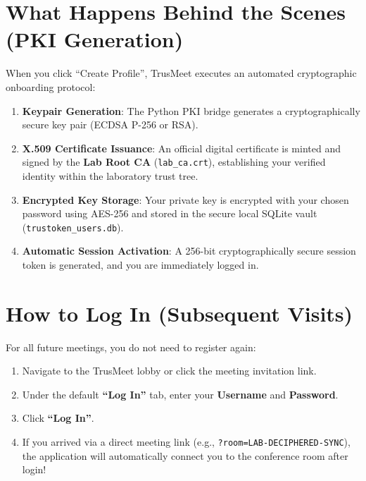 \documentclass[11pt,a4paper]{report}
\begin{document}
\section{What Happens Behind the Scenes (PKI Generation)}
When you click ``Create Profile'', TrusMeet executes an automated cryptographic onboarding protocol:
\begin{enumerate}[noitemsep]
    \item \textbf{Keypair Generation}: The Python PKI bridge generates a cryptographically secure key pair (ECDSA P-256 or RSA).
    \item \textbf{X.509 Certificate Issuance}: An official digital certificate is minted and signed by the \textbf{Lab Root CA} (\texttt{lab\_ca.crt}), establishing your verified identity within the laboratory trust tree.
    \item \textbf{Encrypted Key Storage}: Your private key is encrypted with your chosen password using AES-256 and stored in the secure local SQLite vault (\texttt{trustoken\_users.db}).
    \item \textbf{Automatic Session Activation}: A 256-bit cryptographically secure session token is generated, and you are immediately logged in.
\end{enumerate}

\section{How to Log In (Subsequent Visits)}
For all future meetings, you do not need to register again:
\begin{enumerate}
    \item Navigate to the TrusMeet lobby or click the meeting invitation link.
    \item Under the default \textbf{``Log In''} tab, enter your \textbf{Username} and \textbf{Password}.
    \item Click \textbf{``Log In''}.
    \item If you arrived via a direct meeting link (e.g., \texttt{?room=LAB-DECIPHERED-SYNC}), the application will automatically connect you to the conference room after login!
\end{enumerate}
\end{document}
